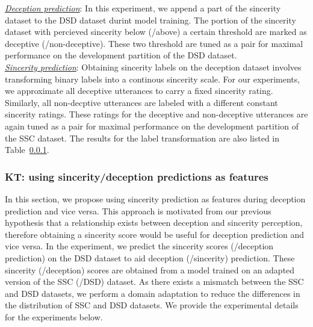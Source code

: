 \documentclass{article}
\begin{document}
\noindent\underline{\it Deception prediction}: 
In this experiment, we append a part of the sincerity dataset to the DSD dataset durint model training.
The portion of the sincerity dataset with percieved sincerity below (/above) a certain threshold are marked as deceptive (/non-deceptive). 
These two threshold are tuned as a pair for maximal performance on the development partition of the DSD dataset. 
\\

\noindent\underline{\it Sincerity prediction}:
Obtaining sincerity labels on the deception dataset involves transforming binary labels into a continous sincerity scale.
For our experiments, we approximate all deceptive utterances to carry a fixed sincerity rating. 
Similarly, all non-decptive utterances are labeled with a different constant sincerity ratings.
These ratings for the deceptive and non-deceptive utterances are again tuned as a pair for maximal performance on the development partition of the SSC dataset.
The results for the label transformation are also listed in Table~\ref{}.

\subsubsection{KT: using sincerity/deception predictions as features}
In this section, we propose using sincerity prediction as features during deception prediction and vice versa.
This approach is motivated from our previous hypothesis that a relationship exists between deception and sincerity perception, therefore obtaining a sincerity score would be useful for deception prediction and vice versa.
In the experiment, we predict the sincerity scores (/deception prediction) on the DSD dataset to aid deception (/sincerity) prediction. 
These sincerity (/deception) scores are obtained from a model trained on an adapted version of the SSC (/DSD) dataset.
As there exists a mismatch between the SSC and DSD datasets, we perform a domain adaptation to reduce the differences in the distribution of SSC and DSD datasets.
We provide the experimental details for the experiments below.
\\
\end{document}
